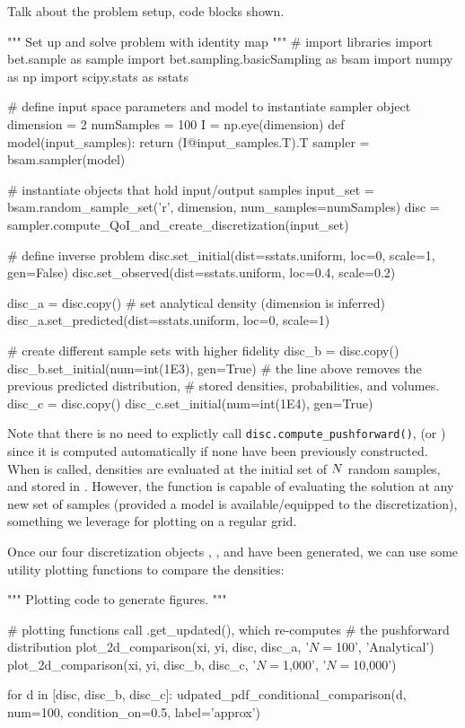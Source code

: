 
Talk about the problem setup, code blocks shown.

\begin{python}
"""
Set up and solve problem with identity map
"""
# import libraries
import bet.sample as sample
import bet.sampling.basicSampling as bsam
import numpy as np
import scipy.stats as sstats

# define input space parameters and model to instantiate sampler object
dimension = 2
numSamples = 100
I = np.eye(dimension)
def model(input_samples):
        return (I@input_samples.T).T
sampler = bsam.sampler(model)

# instantiate objects that hold input/output samples
input_set = bsam.random_sample_set('r', dimension, num_samples=numSamples)
disc = sampler.compute_QoI_and_create_discretization(input_set)

# define inverse problem
disc.set_initial(dist=sstats.uniform, loc=0, scale=1, gen=False)
disc.set_observed(dist=sstats.uniform, loc=0.4, scale=0.2)

disc_a = disc.copy()
# set analytical density (dimension is inferred)
disc_a.set_predicted(dist=sstats.uniform, loc=0, scale=1)

# create different sample sets with higher fidelity
disc_b = disc.copy()
disc_b.set_initial(num=int(1E3), gen=True)
# the line above removes the previous predicted distribution,
#     stored densities, probabilities, and volumes.
disc_c = disc.copy()
disc_c.set_initial(num=int(1E4), gen=True)
\end{python}

Note that there is no need to explictly call {\tt disc.compute\_pushforward()}, (or ) since it is computed automatically if none have been previously constructed.
When  is called, densities are evaluated at the initial set of $N$ random samples, and stored in .
However, the function  is capable of evaluating the solution at any new set of samples (provided a model is available/equipped to the discretization), something we leverage for plotting on a regular grid.

Once our four discretization objects , ,  and  have been generated, we can use some utility plotting functions to compare the densities:

\begin{python}
"""
Plotting code to generate figures.
"""

# plotting functions call .get_updated(), which re-computes
# the pushforward distribution
plot_2d_comparison(xi, yi, disc, disc_a, '$N=$100', 'Analytical')
plot_2d_comparison(xi, yi, disc_b, disc_c, '$N=$1,000', '$N=$10,000')

for d in [disc, disc_b, disc_c]:
    udpated_pdf_conditional_comparison(d, num=100,
                                       condition_on=0.5,
                                       label='approx')
\end{python}

